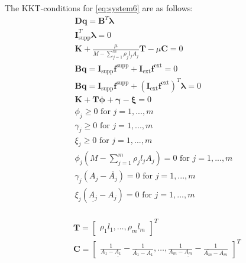 
The KKT-conditions for \eqref{eq:system6} are as follows:
\begin{equation}
\label{KKT_system7}
\begin{aligned}
\bm{Dq} = \bm{B}^{T}\bm{\lambda}\\
\bm{I}^{T}_{\textrm{supp}}\bm{\lambda} = 0 \\
\bm{K} + \frac{\mu}{M-\sum\limits_{j=1}^m\rho_{j}l_{j}A_{j}}\bm{T} - \mu\bm{C} = 0 \\
\bm{Bq} = \bm{I}_{\textrm{supp}}\bm{f}^{\textrm{supp}} + \bm{I}_{\textrm{ext}}\bm{f}^{\textrm{ext}} = 0 \\
\bm{Bq} = \bm{I}_{\textrm{supp}}\bm{f}^{\textrm{supp}} + (\bm{I}_{\textrm{ext}}\bm{f}^{\textrm{ext}})^T\bm{\lambda} = 0 \\
\bm{K} + \bm{T}\bm{\phi} + \bm{\gamma} - \bm{\xi} = 0 \\
\phi_j \geq 0  \text{ for } j = 1,...,m \\
\gamma_j \geq 0 \text{ for } j = 1,...,m \\
\xi_j \geq 0 \text{ for } j = 1,...,m \\
\phi_j(M-\sum\limits_{j=1}^m\rho_{j}l_{j}A_{j}) = 0 \text{ for } j = 1,...,m \\
\gamma_{j}(A_{j}-\overline{A_{j}}) = 0 \text{ for } j = 1,...,m \\
\xi_{j}(\underline{A_{j}}-A_{j}) = 0 \text{ for } j = 1,...,m \\
\end{aligned}
\end{equation}

\begin{align*}
&\bm{T} = \begin{bmatrix}
       \rho_{1}l_{1}
       , \hdots,\rho_{m}l_{m}
     \end{bmatrix}^T \\
&\bm{C} = \begin{bmatrix}
\frac{1}{A_1-\underline{A_{1}}} - \frac{1}{\overline{A_{1}}-A_{1}}, \hdots, \frac{1}{A_m-\underline{A_{m}}} - \frac{1}{\overline{A_{m}}-A_{m}}
\end{bmatrix}^T
\end{align*}